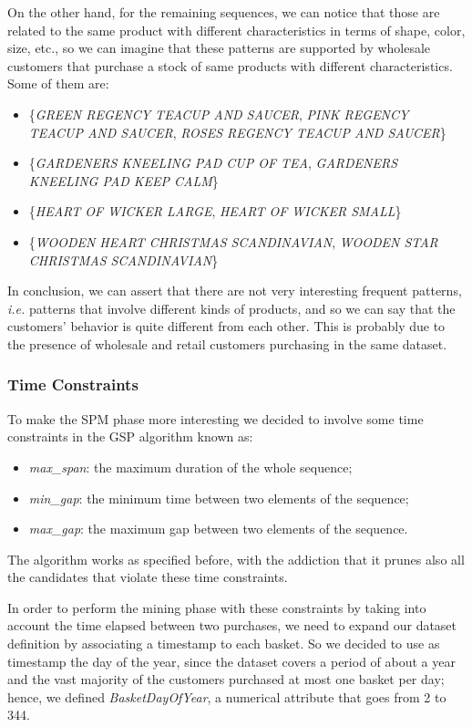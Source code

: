On the other hand, for the remaining sequences, we can notice that those are related to the same product with different characteristics in terms of shape, color, size, etc., so we can imagine that these patterns are supported by wholesale customers that purchase a stock of same products with different characteristics. Some of them are:

\begin{itemize}
\item \{\emph{GREEN REGENCY TEACUP AND SAUCER}, \emph{PINK REGENCY TEACUP AND SAUCER}, \emph{ROSES REGENCY TEACUP AND SAUCER}\}
\item \{\emph{GARDENERS KNEELING PAD CUP OF TEA}, \emph{GARDENERS KNEELING PAD KEEP CALM}\}
\item \{\emph{HEART OF WICKER LARGE}, \emph{HEART OF WICKER SMALL}\}
\item \{\emph{WOODEN HEART CHRISTMAS SCANDINAVIAN}, \emph{WOODEN STAR CHRISTMAS SCANDINAVIAN}\}
\end{itemize}

In conclusion, we can assert that there are not very interesting frequent patterns, \emph{i.e.} patterns that involve different kinds of products, and so we can say that the customers' behavior is quite different from each other. This is probably due to the presence of wholesale and retail customers purchasing in the same dataset.

\subsubsection{Time Constraints}
To make the SPM phase more interesting we decided to involve some time constraints in the GSP algorithm known as:

\begin{itemize}
\item \emph{max\_span}: the maximum duration of the whole sequence;
\item \emph{min\_gap}: the minimum time between two elements of the sequence;
\item \emph{max\_gap}: the maximum gap between two elements of the sequence.
\end{itemize}

The algorithm works as specified before, with the addiction that it prunes also all the candidates that violate these time constraints.

In order to perform the mining phase with these constraints by taking into account the time elapsed between two purchases, we need to expand our dataset definition by associating a timestamp to each basket. So we decided to use as timestamp the day of the year, since the dataset covers a period of about a year and the vast majority of the customers purchased at most one basket per day; hence, we defined \emph{BasketDayOfYear}, a numerical attribute that goes from 2 to 344.


